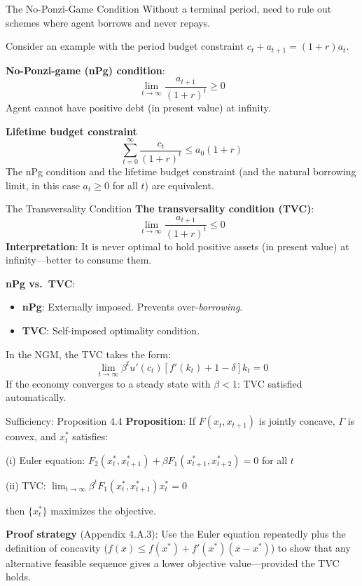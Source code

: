 \documentclass[blue]{beamer}
\begin{document}
\begin{frame}{The No-Ponzi-Game Condition}
	Without a terminal period, need to rule out schemes where agent borrows and never repays.
	
	Consider an example with the period budget constraint $c_t+a_{t+1}=(1+r)a_t$.
	

	\textbf{No-Ponzi-game (nPg) condition}:
	\[
	\lim_{t \to \infty} \frac{a_{t+1}}{(1+r)^t} \geq 0
	\]
		Agent cannot have positive debt (in present value) at infinity.
	

	\textbf{Lifetime budget constraint} 
	\[
	\sum_{t=0}^\infty \frac{c_t}{(1+r)^t} \leq a_0(1+r)
	\]
	The nPg condition and the lifetime budget constraint (and the natural borrowing limit, in this case $a_t\geq 0$ for all $t$) are equivalent.
	
\end{frame}

\begin{frame}{The Transversality Condition}
	\textbf{The transversality condition (TVC)}: 
	$$
	\lim_{t \to \infty} \frac{a_{t+1}}{(1+r)^t} \leq 0
	$$
	\textbf{Interpretation}: It is never optimal to hold positive assets (in present value) at infinity---better to consume them.

	\textbf{nPg vs.\ TVC}:
	\vspace{-6pt}
	\begin{itemize}
		\item \textbf{nPg}: Externally imposed. Prevents over-\emph{borrowing}.
		\item \textbf{TVC}: Self-imposed optimality condition. 
	\end{itemize}
	
	\bigskip
	In the NGM, the TVC takes the form:
	\[
	\lim_{t \to \infty} \beta^t u'(c_t)[f'(k_t) + 1-\delta] k_t = 0
	\]
	If the economy converges to a steady state with $\beta < 1$: TVC satisfied automatically.
\end{frame}

\begin{frame}{Sufficiency: Proposition 4.4}
	\textbf{Proposition}: If $F(x_t, x_{t+1})$ is jointly concave, $\Gamma$ is convex, and $x_t^*$ satisfies:
	
	\medskip
	(i) Euler equation: $F_2(x_t^*, x_{t+1}^*) + \beta F_1(x_{t+1}^*, x_{t+2}^*) = 0$ for all $t$
	
	\medskip
	(ii) TVC: $\lim_{t \to \infty} \beta^t F_1(x_t^*, x_{t+1}^*) x_t^* = 0$
	
	\medskip
	then $\{x_t^*\}$ maximizes the objective.
	
	\bigskip
	\textbf{Proof strategy} (Appendix 4.A.3): Use the Euler equation repeatedly plus the definition of concavity ($f(x) \leq f(x^*) + f'(x^*)(x - x^*)$) to show that any alternative feasible sequence gives a lower objective value---provided the TVC holds.
\end{frame}
\end{document}
